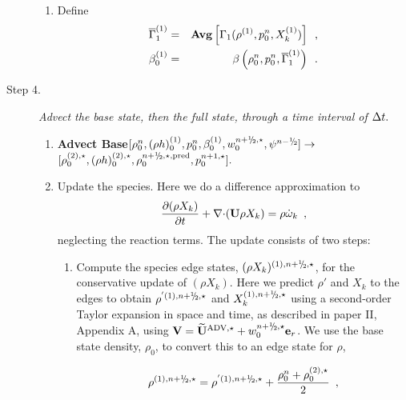 \begin{description}
\begin{enumerate}
\item
Define
\begin{eqnarray}
\overline{\Gamma}_1^{(1)}        &=& {\rm{\bf Avg}} \left[ \Gamma_1(\rho^{(1)}, p_0^{n}, X_k^{(1)}) \right] \enskip , \\
 {\beta   }_0^{(1)}    &=& \beta   \left(\rho_0^{n}, p_0^{n}, \overline{\Gamma}_1^{(1)}\right) \enskip .
\end{eqnarray}

\end{enumerate}

\item[Step 4.] {\em Advect the base state, then the full state, through a time interval 
of $\Delta t.$}

\begin{enumerate}
\renewcommand{\theenumi}{{\bf \alph{enumi}}}

\item {\bf Advect Base}$[\rhozero^{n}, (\rho h)_0^{(1)}, p_0^{n}, \beta_0^{(1)}, w_0^{\nph,\star}, \psi^{\nmh}] \rightarrow $
$[\rho_0^{(2),\star}, (\rho h)_0^{(2),\star}, \rho_0^{\nph,\star,{\rm pred}}, p_0^{n+1,\star}].$ 

\item Update the species.  Here we do a difference approximation
  to 
  \begin{equation}
  \frac{\partial (\rho X_k)}{\partial t} + \mathbf{\nabla} \mathbf{\cdot} ({\bf U} \rho X_k) =
         \rho {\dot{\omega}}_k \enskip , \label{eq:species}
  \end{equation}
  neglecting the reaction terms.  The update consists of two steps:

  \begin{enumerate}
  \renewcommand{\labelenumii}{{\bf \roman{enumii}}.}

  \item Compute the species edge states, $(\rho X_k)^{(1),\nph,\star}$,
  for the conservative update of $(\rho X_k)$. 
  Here we predict $\rho'$ and $X_k$ to the edges to obtain 
  $\rho^{'(1),\nph,\star}$ and $X_k^{(1),\nph,\star}$ using a second-order
  Taylor expansion in space and time, as described in paper II,
  Appendix A, using $\Vb = \uadvone+w_0^{\nph,\star} \er$.  We use the base
  state density, $\rho_0$, to convert this to an edge state for $\rho$,

\begin{equation}
\rho^{(1),\nph,\star} = 
\rho^{'(1),\nph,\star} + \frac{\rho_0^n + \rho_0^{(2),\star}}{2} \enskip ,
\end{equation}


\end{enumerate}
\end{enumerate}
\end{description}
